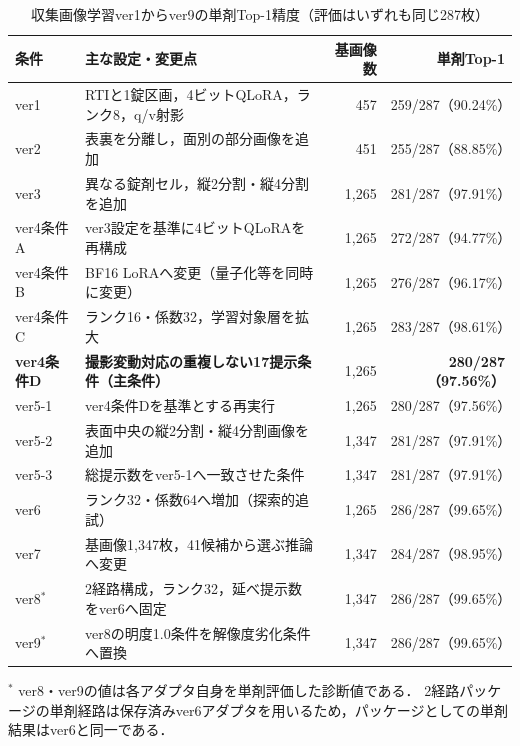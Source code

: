 \documentclass[uplatex,dvipdfmx]{jsarticle}
\begin{document}
\begin{table}[H]
  \centering
  \caption{収集画像学習ver1からver9の単剤Top-1精度（評価はいずれも同じ287枚）}
  \label{tab:ver1_ver9_single}
  \scriptsize
  \setlength{\tabcolsep}{3pt}
  \begin{tabular}{|l|p{5.6cm}|r|r|}
    \hline
    条件 & 主な設定・変更点 & 基画像数 & 単剤Top-1 \\ \hline
    ver1 & RTIと1錠区画，4ビットQLoRA，ランク8，q/v射影 & 457 & 259/287（90.24\%） \\ \hline
    ver2 & 表裏を分離し，面別の部分画像を追加 & 451 & 255/287（88.85\%） \\ \hline
    ver3 & 異なる錠剤セル，縦2分割・縦4分割を追加 & 1,265 & 281/287（97.91\%） \\ \hline
    ver4条件A & ver3設定を基準に4ビットQLoRAを再構成 & 1,265 & 272/287（94.77\%） \\ \hline
    ver4条件B & BF16 LoRAへ変更（量子化等を同時に変更） & 1,265 & 276/287（96.17\%） \\ \hline
    ver4条件C & ランク16・係数32，学習対象層を拡大 & 1,265 & 283/287（98.61\%） \\ \hline
    \textbf{ver4条件D} & \textbf{撮影変動対応の重複しない17提示条件（主条件）} & 1,265 & \textbf{280/287（97.56\%）} \\ \hline
    ver5-1 & ver4条件Dを基準とする再実行 & 1,265 & 280/287（97.56\%） \\ \hline
    ver5-2 & 表面中央の縦2分割・縦4分割画像を追加 & 1,347 & 281/287（97.91\%） \\ \hline
    ver5-3 & 総提示数をver5-1へ一致させた条件 & 1,347 & 281/287（97.91\%） \\ \hline
    ver6 & ランク32・係数64へ増加（探索的追試） & 1,265 & 286/287（99.65\%） \\ \hline
    ver7 & 基画像1,347枚，41候補から選ぶ推論へ変更 & 1,347 & 284/287（98.95\%） \\ \hline
    ver8$^{\ast}$ & 2経路構成，ランク32，延べ提示数をver6へ固定 & 1,347 & 286/287（99.65\%） \\ \hline
    ver9$^{\ast}$ & ver8の明度1.0条件を解像度劣化条件へ置換 & 1,347 & 286/287（99.65\%） \\ \hline
  \end{tabular}

  \vspace{1mm}
  {\scriptsize $^{\ast}$ ver8・ver9の値は各アダプタ自身を単剤評価した診断値である．
  2経路パッケージの単剤経路は保存済みver6アダプタを用いるため，パッケージとしての単剤結果はver6と同一である．}
\end{table}
\end{document}
